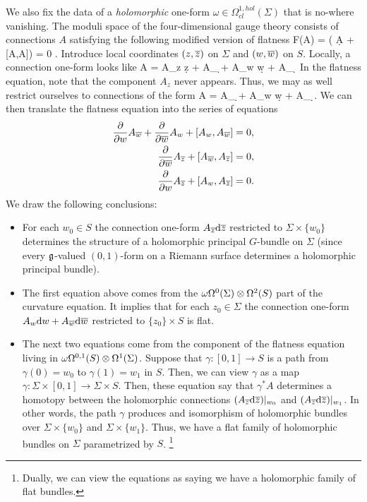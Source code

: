 \documentclass[10pt]{amsart}
\begin{document}
We also fix the data of a {\em holomorphic} one-form $\omega \in \Omega^{1,hol}_{cl}(\Sigma)$ that is no-where vanishing. 
The moduli space of the four-dimensional gauge theory consists of connections $A$ satisfying the following modified version of flatness
\ben
\omega \wedge F(A) = \omega \wedge \left( \d A + [A,A]\right) = 0 .
\een
Introduce local coordinates $(z,\overline{z})$ on $\Sigma$ and $(w, \overline{w})$ on $S$. 
Locally, a connection one-form looks like
\ben
A = A_{z} \d z + A_{\zbar} \d \zbar + A_{w} \d w + A_{\wbar} \d \wbar
\een
In the flatness equation, note that the component $A_z$ never appears. 
Thus, we may as well restrict ourselves to connections of the form
\be\label{connection}
A = A_{\zbar} \d \zbar + A_{w} \d w + A_{\wbar} \d \wbar .
\ee
We can then translate the flatness equation into the series of equations
\begin{align*}
\frac{\partial}{\partial w} A_{\overline{w}} + \frac{\partial}{\partial \overline{w}} A_w + [A_w, A_{\overline{w}}] & = 0 , \\
\frac{\partial}{\partial \overline{w}} A_{\overline{z}} + [A_{\overline{w}}, A_{\overline{z}}] & = 0 , \\
\frac{\partial}{\partial w} A_{\overline{z}} + [A_{w}, A_{\overline{z}}] & = 0 .
\end{align*}
We draw the following conclusions:
\begin{itemize}
\item
For each $w_0 \in S$ the connection one-form $A_{\overline{z}} {\rm d} \overline{z}$ restricted to $\Sigma \times \{w_0\}$ determines the structure of a holomorphic principal $G$-bundle on $\Sigma$ (since every $\mathfrak g$-valued $(0,1)$-form on a Riemann surface determines a holomorphic principal bundle). 
\item
The first equation above comes from the $\omega \Omega^{0}(\Sigma) \otimes \Omega^2(S)$ part of the curvature equation.
It implies that for each $z_0 \in \Sigma$ the connection one-form $A_w {\rm d} w + A_{\overline{w}} {\rm d} \overline{w}$ restricted to $\{z_0\} \times S$ is flat.
\item
The next two equations come from the component of the flatness equation living in $\omega \Omega^{0,1}(S) \otimes \Omega^1(\Sigma)$. 
Suppose that $\gamma : [0,1] \to S$ is a path from $\gamma(0) = w_0$ to $\gamma(1) = w_1$ in $S$. 
Then, we can view $\gamma$ as a map $\gamma : \Sigma \times [0,1] \to \Sigma \times S$. 
Then, these equation say that $\gamma^* A$ determines a homotopy between the holomorphic connections $(A_{\overline{z}} {\rm d} \overline{z})|_{w_0}$ and $(A_{\overline{z}} {\rm d} \overline{z})|_{w_1}$. 
In other words, the path $\gamma$ produces and isomorphism of holomorphic bundles over $\Sigma \times \{w_0\}$ and $\Sigma \times \{w_1\}$. 
Thus, we have a flat family of holomorphic bundles on $\Sigma$ parametrized by $S$. \footnote{
Dually, we can view the equations as saying we have a holomorphic family of flat bundles. }
\end{itemize}
\end{document}
